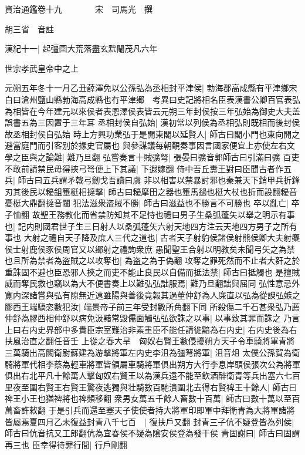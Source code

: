 資治通鑑卷十九　　　　宋　司馬光　撰

胡三省　音註

漢紀十一|{
	起彊圉大荒落盡玄黓閹茂凡六年}


世宗孝武皇帝中之上

元朔五年冬十一月乙丑薛澤免以公孫弘為丞相封平津侯|{
	勃海郡高成縣有平津鄉宋白曰滄州鹽山縣勃海高成縣也冇平津郷　考異曰史記將相名臣表漢書公卿百官表弘為相皆在今年建元以來侯者表恩澤侯表皆云元朔三年封侯按三年弘始為御史大夫盖誤書五為三因置于三年耳}
丞相封侯自弘始|{
	漢初常以列侯為丞相弘則既相而後封侯故丞相封侯自弘始}
時上方興功業弘于是開東閣以延賢人|{
	師古曰閣小門也東向開之避當庭門而引客别於掾史官屬也}
與參謀議每朝覲奏事因言國家便宜上亦使左右文學之臣與之論難|{
	難乃旦翻}
弘嘗奏言十賊彍弩|{
	張晏曰彍音郭師古曰引滿曰彍}
百吏不敢前請禁民毋得挾弓弩便上下其議|{
	下遐嫁翻}
侍中吾丘夀王對曰臣聞古者作五兵|{
	師古曰五兵謂矛戟弓劒戈吾讀曰虞}
非以相害以禁暴討邪也秦兼天下銷甲兵折鋒刃其後民以耰鉏箠梃相撻擊|{
	師古曰耰摩田之器也箠馬撾也梃大杖也折而設翻耰音憂梃大鼎翻撻音闥}
犯法滋衆盗賊不勝|{
	師古曰滋益也不勝言不可勝也}
卒以亂亡|{
	卒子恤翻}
故聖王務教化而省禁防知其不足恃也禮曰男子生桑弧蓬矢以舉之明示有事也|{
	記内則國君世子生三日射人以桑弧蓬矢六射天地四方注云天地四方男子之所有事也}
大射之禮自天子降及庶人三代之道也|{
	古者天子射豹侯諸侯射熊侯卿大夫射麋侯士射鹿侯豕侯周官又以郷射之禮詢衆庶}
愚聞聖王合射以明教矣未聞弓矢之為禁也且所為禁者為盗賊之以攻奪也|{
	為盗之為于偽翻}
攻奪之罪死然而不止者大姧之於重誅固不避也臣恐邪人挾之而吏不能止良民以自備而抵法禁|{
	師古曰抵觸也}
是擅賊威而奪民救也竊以為大不便書奏上以難弘弘詘服焉|{
	難乃旦翻詘與屈同}
弘性意忌外寛内深諸嘗與弘有隙無近遠雖陽與善後竟報其過董仲舒為人廉直以弘為從諛弘嫉之膠西王端驕恣數犯汝|{
	端景帝子前三年受封數所角翻下同}
所殺傷二千石甚衆弘乃薦仲舒為膠西相仲舒以病免汲黯常毁儒面觸弘弘欲誅之以事|{
	以事致其罪而誅之}
乃言上曰右内史界部中多貴臣宗室難治非素重臣不能任請徙黯為右内史|{
	右内史後為右扶風治直之翻任音壬}
上從之春大旱　匈奴右賢王數侵擾朔方天子令車騎將軍青將三萬騎出高闕衛尉蘇建為游擊將軍左内史李沮為彊弩將軍|{
	沮音俎}
太僕公孫賀為衛騎將軍代相李蔡為輕車將軍皆領屬車騎將軍俱出朔方大行李息岸頭侯張次公為將軍俱出右北平凡十餘萬人擊匈奴右賢王以為漢兵遠不能至飲酒醉衛青等兵出塞六七百里夜至圍右賢王右賢王驚夜逃獨與壮騎數百馳潰圍北去得右賢禆王十餘人|{
	師古曰禆王小王也猶禆將也禆頻移翻}
衆男女萬五千餘人畜數十百萬|{
	師古曰數十萬以至百萬畜許敕翻}
于是引兵而還至塞天子使使者持大將軍印即軍中拜衛青為大將軍諸將皆屬焉夏四月乙未復益封青八千七百　|{
	復扶戶又翻}
封青三子伉不疑登皆為列侯|{
	師古曰伉音抗又工郎翻伉為宜春侯不疑為隂安侯登為發干侯}
青固謝曰|{
	師古曰固謂再三也}
臣幸得待罪行間|{
	行戶剛翻}
